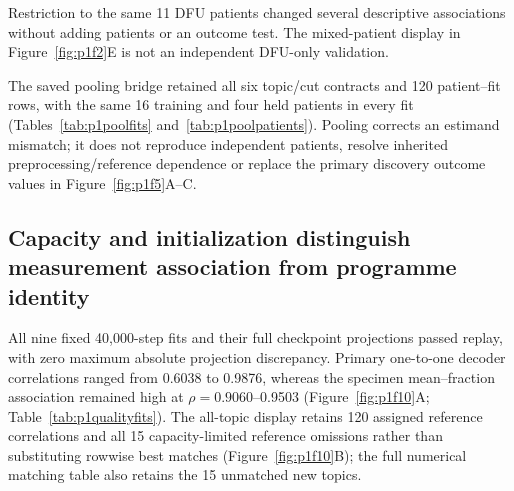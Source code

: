 \documentclass[10pt,a4paper]{article}
\begin{document}
Restriction to the same 11 DFU patients changed several descriptive associations without adding patients or an outcome test. The mixed-patient display in Figure~\ref{fig:p1f2}E is not an independent DFU-only validation.

The saved pooling bridge retained all six topic/cut contracts and 120 patient--fit rows, with the same 16 training and four held patients in every fit (Tables~\ref{tab:p1poolfits} and~\ref{tab:p1poolpatients}). Pooling corrects an estimand mismatch; it does not reproduce independent patients, resolve inherited preprocessing/reference dependence or replace the primary discovery outcome values in Figure~\ref{fig:p1f5}A--C.

\subsection{Capacity and initialization distinguish measurement association from programme identity}

All nine fixed 40,000-step fits and their full checkpoint projections passed replay, with zero maximum absolute projection discrepancy. Primary one-to-one decoder correlations ranged from 0.6038 to 0.9876, whereas the specimen mean--fraction association remained high at $\rho=0.9060$--0.9503 (Figure~\ref{fig:p1f10}A\label{call:p1f10}; Table~\ref{tab:p1qualityfits}). The all-topic display retains 120 assigned reference correlations and all 15 capacity-limited reference omissions rather than substituting rowwise best matches (Figure~\ref{fig:p1f10}B); the full numerical matching table also retains the 15 unmatched new topics.
\end{document}

